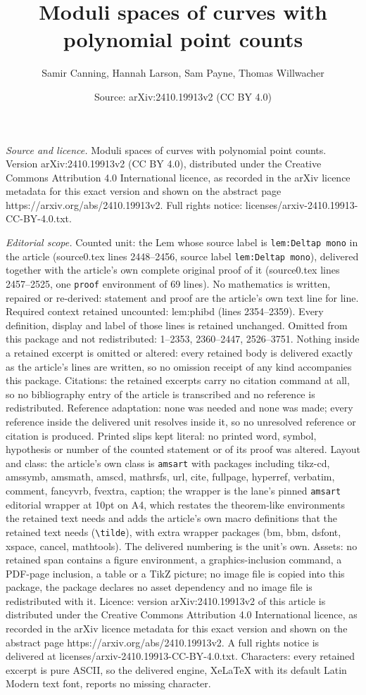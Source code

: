 \documentclass[10pt,a4paper]{amsart}
\title[Moduli spaces of curves with polynomial point counts]{Moduli spaces of curves with polynomial point counts}
\author{Samir Canning, Hannah Larson, Sam Payne, Thomas Willwacher}
\date{Source: arXiv:2410.19913v2 (CC BY 4.0)}
\begin{document}
\maketitle

\noindent\emph{Source and licence.} Moduli spaces of curves with polynomial point counts. Version arXiv:2410.19913v2 (CC BY 4.0), distributed under the Creative Commons Attribution 4.0 International licence, as recorded in the arXiv licence metadata for this exact version and shown on the abstract page https://arxiv.org/abs/2410.19913v2. Full rights notice: licenses/arxiv-2410.19913-CC-BY-4.0.txt.\par\smallskip

\noindent\textit{Editorial scope.} Counted unit: the Lem whose source label is \texttt{lem:Deltap mono} in the article (source0.tex lines 2448--2456, source label \texttt{lem:Deltap mono}), delivered together with the article's own complete original proof of it (source0.tex lines 2457--2525, one \texttt{proof} environment of 69 lines). No mathematics is written, repaired or re-derived: statement and proof are the article's own text line for line. Required context retained uncounted: lem:phibd (lines 2354--2359). Every definition, display and label of those lines is retained unchanged. Omitted from this package and not redistributed: 1--2353, 2360--2447, 2526--3751. Nothing inside a retained excerpt is omitted or altered: every retained body is delivered exactly as the article's lines are written, so no omission receipt of any kind accompanies this package. Citations: the retained excerpts carry no citation command at all, so no bibliography entry of the article is transcribed and no reference is redistributed. Reference adaptation: none was needed and none was made; every reference inside the delivered unit resolves inside it, so no unresolved reference or citation is produced. Printed slips kept literal: no printed word, symbol, hypothesis or number of the counted statement or of its proof was altered. Layout and class: the article's own class is \texttt{amsart} with packages including tikz-cd, amssymb, amsmath, amscd, mathrsfs, url, cite, fullpage, hyperref, verbatim, comment, fancyvrb, fvextra, caption; the wrapper is the lane's pinned \texttt{amsart} editorial wrapper at 10pt on A4, which restates the theorem-like environments the retained text needs and adds the article's own macro definitions that the retained text needs (\texttt{\textbackslash tilde}), with extra wrapper packages (bm, bbm, dsfont, xspace, cancel, mathtools). The delivered numbering is the unit's own. Assets: no retained span contains a figure environment, a graphics-inclusion command, a PDF-page inclusion, a table or a TikZ picture; no image file is copied into this package, the package declares no asset dependency and no image file is redistributed with it. Licence: version arXiv:2410.19913v2 of this article is distributed under the Creative Commons Attribution 4.0 International licence, as recorded in the arXiv licence metadata for this exact version and shown on the abstract page https://arxiv.org/abs/2410.19913v2. A full rights notice is delivered at licenses/arxiv-2410.19913-CC-BY-4.0.txt. Characters: every retained excerpt is pure ASCII, so the delivered engine, XeLaTeX with its default Latin Modern text font, reports no missing character.
\end{document}
